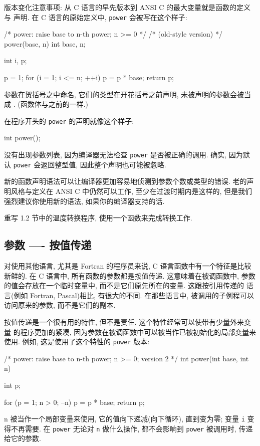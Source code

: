 版本变化注意事项: 从 C 语言的早先版本到 ANSI C 的最大变量就是函数的定义与
声明. 在 C 语言的原始定义中, \texttt{power} 会被写在这个样子:
\begin{myverbatim}
    /* power: raise base to n-th power; n >= 0 */
    /* (old-style version) */
    power(base, n)
    int base, n;
    {
        int i, p;
        
        p = 1;
        for (i = 1; i <= n; ++i)
            p = p * base;
        return p;
    }
\end{myverbatim}
参数在贺括号之中命名, 它们的类型在开花括号之前声明, 未被声明的参数会被当成
\cint. (函数体与之前的一样.)

在程序开头的 \texttt{power} 的声明就像这个样子:
\begin{myverbatim}
    int power();
\end{myverbatim}
没有出现参数列表, 因为编译器无法检查 \texttt{power} 是否被正确的调用. 确实,
因为默认 \texttt{power} 会返回整型值, 因此整个声明也可能被忽略.

新的函数声明语法可以让编译器更加容易地侦测到参数个数或类型的错误.
老的声明风格与定义在 ANSI C 中仍然可以工作, 至少在过渡时期内是这样的,
但是我们强烈建议你使用新的语法, 如果你的编译器支持的话.

\exercise 重写 1.2 节中的温度转换程序, 使用一个函数来完成转换工作.

\subsection{参数 ---- 按值传递}
对使用其他语言, 尤其是 Fortran 的程序员来说, C 语言函数中有一个特征是比较 
新鲜的. 在 C 语言中, 所有函数的参数都是按值传递. 这意味着在被调函数中,
参数的值会存放在一个临时变量中, 而不是它们原先所在的变量. 这跟按引用传递的
语言(例如 Fortran, Pascal)相比, 有很大的不同. 在那些语言中,
被调用的子例程可以访问原来的参数, 而不是它们的副本.

按值传递是一个很有用的特性, 但不是责任. 这个特性经常可以使带有少量外来变量
的程序更加的紧凑, 因为参数在被调函数中可以被当作已被初始化的局部变量来使用.
例如, 这是使用了这个特性的 \texttt{power} 版本:
\begin{myverbatim}
    /* power: raise base to n-th power; n >= 0; version 2 */
    int power(int base, int n)
    {
        int p;

        for (p = 1; n > 0; --n)
            p = p * base;
        return p;
    }
\end{myverbatim}
n 被当作一个局部变量来使用, 它的值向下递减(\cfor 向下循环), 直到变为零;
变量 \texttt{i} 变得不再需要. 在 \texttt{power} 无论对 \texttt{n} 做什么操作,
都不会影响到 \texttt{power} 被调用时, 传递给它的参数.

